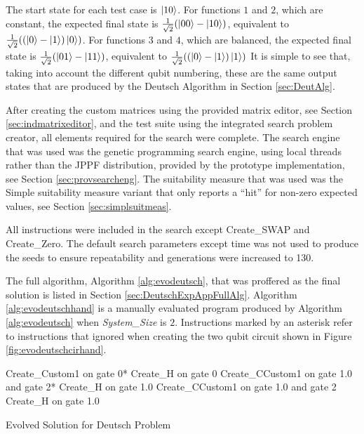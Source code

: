 The start state for each test case is $\left\vert{10}\right\rangle$.
For functions $1$ and $2$, which are constant, the expected final state is $\frac{1}{\sqrt{2}}(\left\vert{00}\right\rangle-\left\vert{10}\right\rangle)$, equivalent to $\frac{1}{\sqrt{2}}((\left\vert{0}\right\rangle-\left\vert{1}\right\rangle)\left\vert{0}\right\rangle)$.
For functions $3$ and $4$, which are balanced, the expected final state is $\frac{1}{\sqrt{2}}(\left\vert{01}\right\rangle-\left\vert{11}\right\rangle)$, equivalent to $\frac{1}{\sqrt{2}}((\left\vert{0}\right\rangle-\left\vert{1}\right\rangle)\left\vert{1}\right\rangle)$
It is simple to see that, taking into account the different qubit numbering, these are the same output states that are produced by the Deutsch Algorithm in Section \ref{sec:DeutAlg}.

After creating the custom matrices using the provided matrix editor, see Section \ref{sec:indmatrixeditor}, and the test suite using the integrated search problem creator, all elements required for the search were complete.
The search engine that was used was the genetic programming search engine, using local threads rather than the JPPF distribution, provided by the prototype implementation, see Section \ref{sec:provsearcheng}.
The suitability measure that was used was the Simple suitability measure variant that only reports a ``hit'' for non-zero expected values, see Section \ref{sec:simplsuitmeas}.

All instructions were included in the search except Create\_SWAP and Create\_Zero.
The default search parameters except time was not used to produce the seeds to ensure repeatability and generations were increased to 130.

The full algorithm, Algorithm \ref{alg:evodeutsch}, that was proffered as the final solution is listed in Section \ref{sec:DeutschExpAppFullAlg}.
Algorithm \ref{alg:evodeutschhand} is a manually evaluated program produced by Algorithm \ref{alg:evodeutsch} when \emph{System\_Size} is $2$.
Instructions marked by an asterisk refer to instructions that ignored when creating the two qubit circuit shown in Figure \ref{fig:evodeutschcirhand}.

\begin{algorithm}
 \begin{algorithmic}
\STATE Create\_Custom1 on gate 0*
\STATE Create\_H on gate 0
\STATE Create\_CCustom1 on gate 1.0 and gate 2*
\STATE Create\_H on gate 1.0
\STATE Create\_CCustom1 on gate 1.0 and gate 2
\STATE Create\_H on gate 1.0
 \end{algorithmic}
\caption{Evolved Solution for Deutsch Problem}
\label{alg:evodeutschhand}
\end{algorithm}

\begin{lstlisting}
\end{lstlisting}

